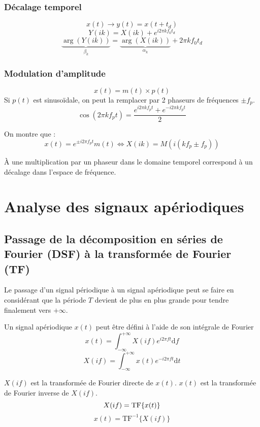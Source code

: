 \documentclass[a4paper,12pt]{report}
\begin{document}
\subsection{Décalage temporel}

\[ x(t) \longrightarrow y(t) = x(t + t_d) \]
\[ Y(ik) = X(ik) + e^{i2\pi kf_0 t_d} \]
\[ \underbrace{\arg(Y(ik))}_{\beta_k} = \underbrace{\arg(X(ik))}_{\alpha_k} + 2\pi kf_0 t_d \]

\subsection{Modulation d'amplitude}

\[ x(t) = m(t) \times p(t) \]
Si $p(t)$ est sinusoïdale, on peut la remplacer par 2 phaseurs de fréquences $\pm f_p$.
\[ \cos(2\pi kf_pt) = \dfrac{e^{i2\pi kf_pt} + e^{-i2\pi kf_pt}}{2} \]

On montre que :
\[ x(t) = e^{\pm i2\pi f_pt}m(t) \Leftrightarrow X(ik) = M(i(kf_p \pm f_p)) \]

À une multiplication par un phaseur dans le domaine temporel correspond à un décalage dans l'espace de fréquence.

\chapter{Analyse des signaux apériodiques}

\section{Passage de la décomposition en séries de Fourier (DSF) à la transformée de Fourier (TF)}

Le passage d'un signal périodique à un signal apériodique peut se faire en considérant que la période $T$ devient de plus en plus grande pour tendre finalement vers $+\infty$.

\begin{defi}
    Un signal apériodique $x(t)$ peut être défini à l'aide de son intégrale de Fourier
    \[ x(t) = \int_{-\infty}^{+\infty} X(if) e^{i2\pi ft} \mathrm{d}f \]
    \[ X(if) = \int_{-\infty}^{+\infty} x(t) e^{-i2\pi ft} \mathrm{d}t \]

    $X(if)$ est la transformée de Fourier directe de $x(t)$. $x(t)$ est la transformée de Fourier inverse de $X(if)$.
    \[ X(if) = \mathrm{TF} \{ x(t) \} \]
    \[ x(t) = \mathrm{TF}^{-1} \{X(if)\} \]
\end{defi}
\end{document}
